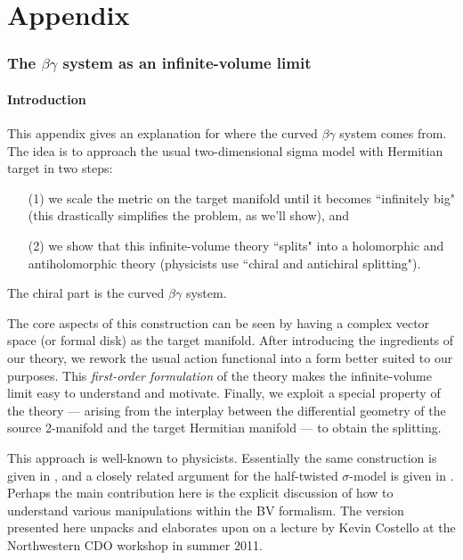 \part*{Appendix}

\section{The $\beta\gamma$ system as an infinite-volume limit}

\subsection{Introduction}

This appendix gives an explanation for where the curved $\beta\gamma$ system comes from.
The idea is to approach the usual two-dimensional sigma model with Hermitian target in two steps: 
\begin{enumerate}
\item[(1)] we scale the metric on the target manifold until it becomes ``infinitely big" (this drastically simplifies the problem, as we'll show), and 
\item[(2)] we show that this infinite-volume theory ``splits" into a holomorphic and antiholomorphic theory (physicists use ``chiral and antichiral splitting").
\end{enumerate}
The chiral part is the curved $\beta\gamma$ system.

The core aspects of this construction can be seen by having a complex vector space (or formal disk) as the target manifold. After introducing the ingredients of our theory, we rework the usual action functional into a form better suited to our purposes. This {\em first-order formulation} of the theory makes the infinite-volume limit easy to understand and motivate. Finally, we exploit a special property of the theory --- arising from the interplay between the differential geometry of the source 2-manifold and the target Hermitian manifold --- to obtain the splitting.

\begin{rmk}
This approach is well-known to physicists.
Essentially the same construction is given in \cite{Zeitlin,LMZ,Nek}, and a closely related argument for the half-twisted $\sigma$-model is given in \cite{KapCDR}.
Perhaps the main contribution here is the explicit discussion of how to understand various manipulations within the BV formalism.
The version presented here unpacks and elaborates upon on a lecture by Kevin Costello at the Northwestern CDO workshop in summer 2011.
\end{rmk}

